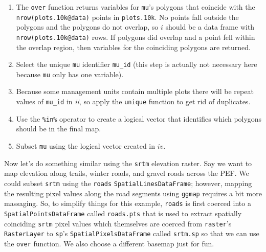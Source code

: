 \documentclass[]{krantz}
\providecommand{\tightlist}{%
  \setlength{\itemsep}{0pt}\setlength{\parskip}{0pt}}
\begin{document}
\begin{enumerate}
\def\labelenumi{\roman{enumi}.}
\tightlist
\item
  The \texttt{over} function returns variables for \texttt{mu}'s polygons that coincide with the \texttt{nrow(plots.10k@data)} points in \texttt{plots.10k}. No points fall outside the polygons and the polygons do not overlap, so \(i\) should be a data frame with \texttt{nrow(plots.10k@data)} rows. If polygons did overlap and a point fell within the overlap region, then variables for the coinciding polygons are returned.
\item
  Select the unique \texttt{mu} identifier \texttt{mu\_id} (this step is actually not necessary here because \texttt{mu} only has one variable).
\item
  Because some management units contain multiple plots there will be repeat values of \texttt{mu\_id} in \emph{ii}, so apply the \texttt{unique} function to get rid of duplicates.
\item
  Use the \texttt{\%in\%} operator to create a logical vector that identifies which polygons should be in the final map.
\item
  Subset \texttt{mu} using the logical vector created in \(iv\).
\end{enumerate}

Now let's do something similar using the \texttt{srtm} elevation raster. Say we want to map elevation along trails, winter roads, and gravel roads across the PEF. We could subset \texttt{srtm} using the \texttt{roads} \texttt{SpatialLinesDataFrame}; however, mapping the resulting pixel values along the road segments using \texttt{ggmap} requires a bit more massaging. So, to simplify things for this example, \texttt{roads} is first coerced into a \texttt{SpatialPointsDataFrame} called \texttt{roads.pts} that is used to extract spatially coinciding \texttt{srtm} pixel values which themselves are coerced from \texttt{raster}'s \texttt{RasterLayer} to \texttt{sp}'s \texttt{SpatialPixelsDataFrame} called \texttt{srtm.sp} so that we can use the \texttt{over} function. We also choose a different basemap just for fun.
\end{document}
